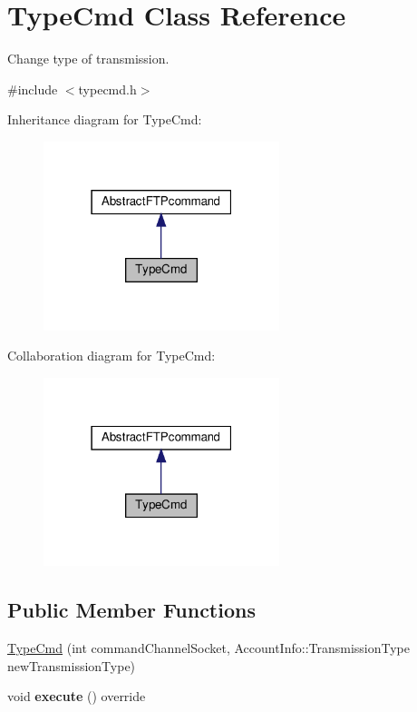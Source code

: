 \hypertarget{classTypeCmd}{}\section{Type\+Cmd Class Reference}
\label{classTypeCmd}


Change type of transmission.  




{\ttfamily \#include $<$typecmd.\+h$>$}



Inheritance diagram for Type\+Cmd\+:\nopagebreak
\begin{figure}[H]
\begin{center}
\leavevmode
\includegraphics[width=195pt]{dc/dc0/classTypeCmd__inherit__graph}
\end{center}
\end{figure}


Collaboration diagram for Type\+Cmd\+:\nopagebreak
\begin{figure}[H]
\begin{center}
\leavevmode
\includegraphics[width=195pt]{d3/dd6/classTypeCmd__coll__graph}
\end{center}
\end{figure}
\subsection*{Public Member Functions}
\begin{DoxyCompactItemize}
\item 
\hyperlink{classTypeCmd_a33586ed2ac513ef510cb523044558d1a}{Type\+Cmd} (int command\+Channel\+Socket, Account\+Info\+::\+Transmission\+Type new\+Transmission\+Type)
\item 
\mbox{\label{classTypeCmd_ab26c8c8ec6c2ffa70e5d11cbced78f71}} 
void {\bfseries execute} () override
\end{DoxyCompactItemize}
